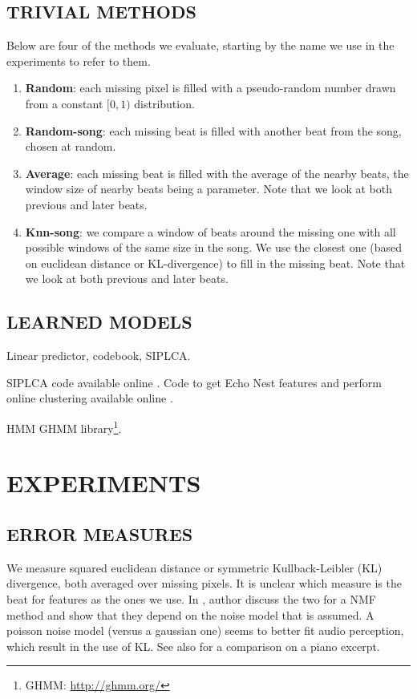 \documentclass{article}
\begin{document}
\subsection{TRIVIAL METHODS}
\label{ssec:trivialmethods}
Below are four of the methods we evaluate, starting by the name we use in the experiments
to refer to them.
\begin{enumerate}
\item \textbf{Random}: each missing pixel is filled with a pseudo-random number drawn from
a constant $[0,1)$ distribution.
\item \textbf{Random-song}: each missing beat is filled with another beat from the song,
chosen at random.
\item \textbf{Average}: each missing beat is filled with the average of the nearby beats,
the window size of nearby beats being a parameter. Note that we look at both previous and
later beats.
\item \textbf{Knn-song}: we compare a window of beats around the missing one with
all possible windows of the same size in the song. We use the closest one (based on euclidean
distance or KL-divergence) to fill in the missing beat. Note that we look at both
previous and later beats.
\end{enumerate}

\subsection{LEARNED MODELS}
\label{ssec:learnedmodels}

Linear predictor, codebook, SIPLCA.

SIPLCA code available online \cite{Weiss2010}. Code to get Echo Nest features and perform
online clustering available online \cite{Bertin-Mahieux2010a}.

HMM \cite{Rabiner1989} GHMM library\footnote{GHMM: \url{http://ghmm.org/}}.

\section{EXPERIMENTS}
\label{sec:experiments}

\subsection{ERROR MEASURES}
\label{ssec:errmeasures}
We measure squared euclidean distance or symmetric Kullback-Leibler (KL) divergence,
both averaged over missing pixels. It is unclear which measure is the beat for features
as the ones we use. In \cite{Sajda2003}, author discuss the two for
a NMF method and show that they depend on the noise model that is assumed.
A poisson noise model (versus a gaussian one) seems to better fit audio perception, 
which result in the use of KL. See also \cite{Fevotte2009} for a comparison on a piano
excerpt.
\end{document}
